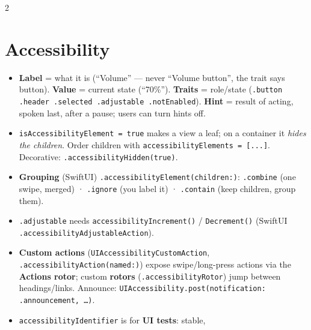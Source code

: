 \documentclass[8pt]{extarticle}
\begin{document}


\begin{multicols}{2}
\raggedright

\section{Accessibility}
\begin{itemize}
  \item \textbf{Label} = what it is (``Volume'' — never ``Volume button'', the
        trait says button). \textbf{Value} = current state (``70\%'').
        \textbf{Traits} = role/state (\texttt{.button .header .selected
        .adjustable .notEnabled}). \textbf{Hint} = result of acting, spoken
        last, after a pause; users can turn hints off.
  \item \texttt{isAccessibilityElement = true} makes a view a leaf;
        on a container it \emph{hides the children}. Order children with
        \texttt{accessibilityElements = [...]}. Decorative:
        \texttt{.accessibilityHidden(true)}.
  \item \textbf{Grouping} (SwiftUI) \texttt{.accessibilityElement(children:)}:
        \texttt{.combine} (one swipe, merged) · \texttt{.ignore} (you label it)
        · \texttt{.contain} (keep children, group them).
  \item \texttt{.adjustable} needs \texttt{accessibilityIncrement()} /
        \texttt{Decrement()} (SwiftUI \texttt{.accessibilityAdjustableAction}).
  \item \textbf{Custom actions} (\texttt{UIAccessibilityCustomAction},
        \texttt{.accessibilityAction(named:)}) expose swipe/long-press
        actions via the \textbf{Actions rotor}; custom \textbf{rotors}
        (\texttt{.accessibilityRotor}) jump between headings/links.
        Announce: \texttt{UIAccessibility.post(notification: .announcement, \ldots)}.
  \item \texttt{accessibilityIdentifier} is for \textbf{UI tests}: stable,

\end{itemize}
\end{multicols}
\end{document}
